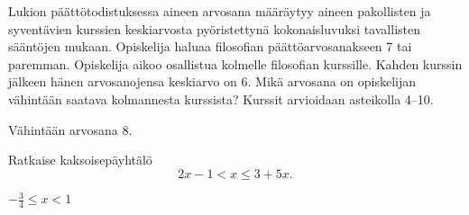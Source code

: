 \begin{tehtavasivu}
\begin{tehtava}
Lukion päättötodistuksessa aineen arvosana määräytyy aineen pakollisten ja syventävien kurssien keskiarvosta pyöristettynä kokonaisluvuksi tavallisten 
sääntöjen mukaan. Opiskelija haluaa filosofian päättöarvosanakseen 7 tai paremman. Opiskelija aikoo osallistua kolmelle filosofian kurssille. Kahden 
kurssin jälkeen hänen arvosanojensa keskiarvo on 6. Mikä arvosana on opiskelijan vähintään saatava kolmannesta kurssista? Kurssit arvioidaan asteikolla 
4--10.
\begin{vastaus}
Vähintään arvosana 8.
\end{vastaus}
\end{tehtava}

\begin{tehtava}
Ratkaise kaksoisepäyhtälö
\[ 2x-1 < x \leq 3+5x.  \]
    \begin{vastaus}
        $-\frac{3}{4} \leq x < 1$
    \end{vastaus}
\end{tehtava}

\end{tehtavasivu}
